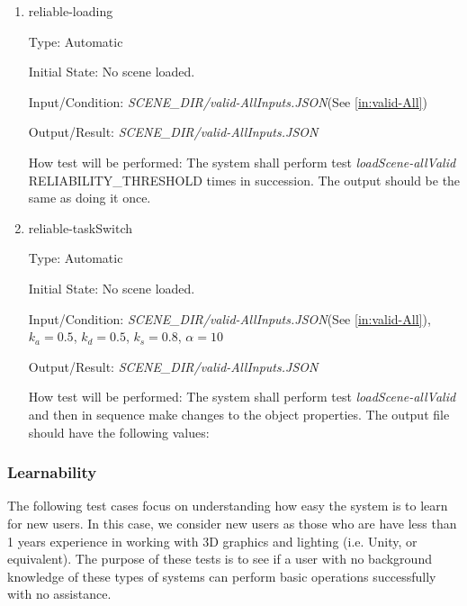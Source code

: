 \documentclass[12pt, titlepage]{article}
\begin{document}
\begin{enumerate}
	
	\item{reliable-loading\\}
	
	Type: Automatic 
	
	Initial State: No scene loaded.
	
	Input/Condition: \textit{SCENE\_DIR/valid-AllInputs.JSON}(See 
	\ref{in:valid-All})
	
	Output/Result: \textit{SCENE\_DIR/valid-AllInputs.JSON}
	
	How test will be performed: The system shall perform test 
	\textit{loadScene-allValid} RELIABILITY\_THRESHOLD times in succession. The 
	output should be the same as doing it once.


	\item{reliable-taskSwitch\\}
	
	Type: Automatic
	
	Initial State: No scene loaded.
	
	Input/Condition: \textit{SCENE\_DIR/valid-AllInputs.JSON}(See 
	\ref{in:valid-All}), $k_{a} = 0.5$, 
	$k_{d} = 0.5$, $k_{s} = 0.8$, $\alpha = 10$
	
	Output/Result: \textit{SCENE\_DIR/valid-AllInputs.JSON}
	
	How test will be performed: The system shall perform test 
	\textit{loadScene-allValid} and then in sequence make changes to the object 
	properties. The output file should have the following values:

\end{enumerate}

\subsubsection{Learnability}
The following test cases focus on understanding how easy the system is to learn 
for new users. In this case, we consider new users as those who are have less 
than 1 years experience in working with 3D graphics and lighting (i.e. Unity, 
or equivalent). The purpose of these tests is to see if a user with no 
background knowledge of these types of systems can perform basic operations 
successfully with no assistance.
\end{document}
